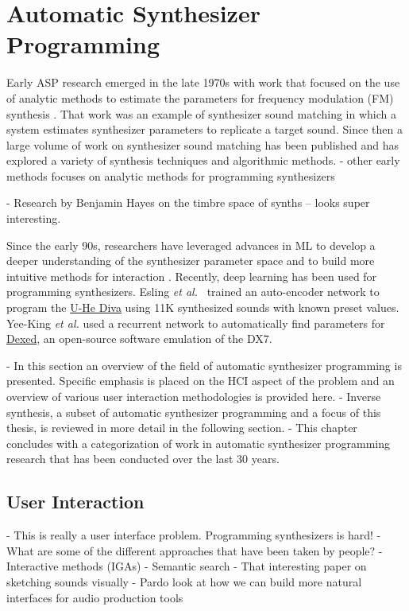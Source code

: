 \section{Automatic Synthesizer Programming}
Early ASP research emerged in the late 1970s with work that focused on the use of analytic methods to estimate the parameters for frequency modulation (FM) synthesis \cite{justice1979analytic}. That work was an example of synthesizer sound matching in which a system estimates synthesizer parameters to replicate a target sound. Since then a large volume of work on synthesizer sound matching has been published and has explored a variety of synthesis techniques and algorithmic methods.
- other early methods focuses on analytic methods for programming synthesizers \cite{beauchamp1982synthesis, payne1987microcomputer, delprat1990parameter}

- Research by Benjamin Hayes on the timbre space of synths -- looks super interesting.

Since the early 90s, researchers have leveraged advances in ML to develop a deeper understanding of the synthesizer parameter space and to build more intuitive methods for interaction \cite{horner1993machine}. Recently, deep learning has been used for programming synthesizers.  Esling {\em et al.}\ \cite{esling2020flow} trained an auto-encoder network to program the \href{https://u-he.com/products/diva/}{U-He Diva} using 11K synthesized sounds with known preset values. Yee-King {\em et al.} \cite{yee2018automatic} used a recurrent network to automatically find parameters for \href{https://asb2m10.github.io/dexed/}{Dexed}, an open-source software emulation of the DX7.

- In this section an overview of the field of automatic synthesizer programming is presented. Specific emphasis is placed on the HCI aspect of the problem and an overview of various user interaction methodologies is provided here.
- Inverse synthesis, a subset of automatic synthesizer programming and a focus of this thesis, is reviewed in more detail in the following section.
- This chapter concludes with a categorization of work in automatic synthesizer programming research that has been conducted over the last 30 years.

\subsection{User Interaction}
- This is really a user interface problem. Programming synthesizers is hard!
- What are some of the different approaches that have been taken by people?
- Interactive methods (IGAs)
- Semantic search
- That interesting paper on sketching sounds visually
- Pardo look at how we can build more natural interfaces for audio production tools \cite{pardo2019learning} 

